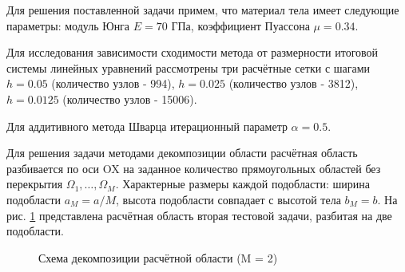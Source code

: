 \documentclass[a4paper]{article}
\begin{document}
Для решения поставленной задачи примем, что материал тела имеет следующие параметры: модуль Юнга $E = 70$ ГПа, коэффициент Пуассона $\mu = 0.34$. 

Для исследования зависимости сходимости метода от размерности итоговой системы линейных уравнений рассмотрены три расчётные сетки с шагами $h = 0.05$ (количество узлов - 994), $h = 0.025$ (количество узлов - 3812), $h = 0.0125$ (количество узлов - 15006).

Для аддитивного метода Шварца итерационный параметр $\alpha = 0.5$.

\newpage

Для решения задачи методами декомпозиции области расчётная область разбивается по оси OX на заданное количество прямоугольных областей без перекрытия $\Omega_1, \ldots, \Omega_M$. Характерные размеры каждой подобласти: ширина подобласти $a_M = a / M$, высота подобласти совпадает с высотой тела $b_M = b$. На рис. \ref{fig:task_02_decomposition} представлена расчётная область вторая тестовой задачи, разбитая на две подобласти.

\begin{figure}[h]
\caption{Схема декомпозиции расчётной области (M = 2)}
\label{fig:task_02_decomposition}
\end{figure}
\end{document}
